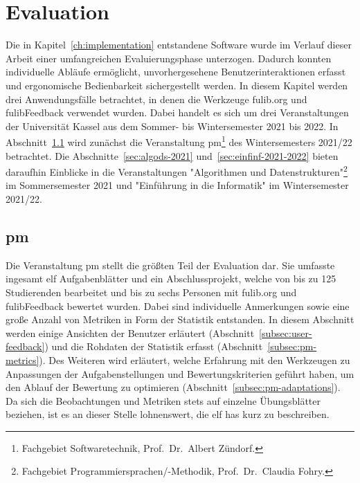 \chapter{Evaluation}\label{ch:evaluation}

Die in Kapitel~\ref{ch:implementation} entstandene Software wurde im Verlauf dieser Arbeit einer umfangreichen Evaluierungsphase unterzogen.
Dadurch konnten individuelle Abläufe ermöglicht, unvorhergesehene Benutzerinteraktionen erfasst und ergonomische Bedienbarkeit sichergestellt werden.
In diesem Kapitel werden drei Anwendungsfälle betrachtet, in denen die Werkzeuge fulib.org und fulibFeedback verwendet wurden.
Dabei handelt es sich um drei Veranstaltungen der Universität Kassel aus dem Sommer- bis Wintersemester 2021 bis 2022.
In Abschnitt~\ref{sec:pm-2021-2022} wird zunächst die Veranstaltung \ac{pm}\footnote{
    Fachgebiet Softwaretechnik, Prof.\ Dr.\ Albert Zündorf.
} des Wintersemesters 2021/22 betrachtet.
Die Abschnitte~\ref{sec:algods-2021} und~\ref{sec:einfinf-2021-2022} bieten daraufhin Einblicke in die Veranstaltungen "Algorithmen und Datenstrukturen"\footnote{
    Fachgebiet Programmiersprachen/-Methodik, Prof.\ Dr.\ Claudia Fohry.\label{fn:fg-plm}
} im Sommersemester 2021 und "Einführung in die Informatik" im Wintersemester 2021/22.


\section{\acl{pm}}\label{sec:pm-2021-2022}

Die Veranstaltung \ac{pm} stellt die größten Teil der Evaluation dar.
Sie umfasste ingesamt elf Aufgabenblätter und ein Abschlussprojekt, welche von bis zu 125 Studierenden bearbeitet und bis zu sechs Personen mit fulib.org und fulibFeedback bewertet wurden.
Dabei sind individuelle Anmerkungen sowie eine große Anzahl von Metriken in Form der Statistik entstanden.
In diesem Abschnitt werden einige Ansichten der Benutzer erläutert (Abschnitt~\ref{subsec:user-feedback}) und die Rohdaten der Statistik erfasst (Abschnitt~\ref{subsec:pm-metrics}).
Des Weiteren wird erläutert, welche Erfahrung mit den Werkzeugen zu Anpassungen der Aufgabenstellungen und Bewertungskriterien geführt haben, um den Ablauf der Bewertung zu optimieren (Abschnitt~\ref{subsec:pm-adaptations}).
Da sich die Beobachtungen und Metriken stets auf einzelne Übungsblätter beziehen, ist es an dieser Stelle lohnenswert, die elf \acp{ha} kurz zu beschreiben.

